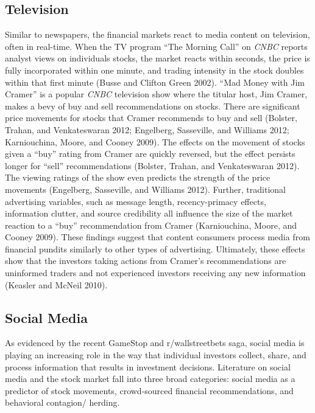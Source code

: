 \documentclass[12pt,]{article}
\begin{document}
\hypertarget{television}{%
\subsection{Television}\label{television}}

Similar to newspapers, the financial markets react to media content on
television, often in real-time. When the TV program ``The Morning Call''
on \emph{CNBC} reports analyst views on individuals stocks, the market
reacts within seconds, the price is fully incorporated within one
minute, and trading intensity in the stock doubles within that first
minute (Busse and Clifton Green 2002). ``Mad Money with Jim Cramer'' is
a popular \emph{CNBC} television show where the titular host, Jim
Cramer, makes a bevy of buy and sell recommendations on stocks. There
are significant price movements for stocks that Cramer recommends to buy
and sell (Bolster, Trahan, and Venkateswaran 2012; Engelberg,
Sasseville, and Williams 2012; Karniouchina, Moore, and Cooney 2009).
The effects on the movement of stocks given a ``buy'' rating from Cramer
are quickly reversed, but the effect persists longer for ``sell''
recommendations (Bolster, Trahan, and Venkateswaran 2012). The viewing
ratings of the show even predicts the strength of the price movements
(Engelberg, Sasseville, and Williams 2012). Further, traditional
advertising variables, such as message length, recency-primacy effects,
information clutter, and source credibility all influence the size of
the market reaction to a ``buy'' recommendation from Cramer
(Karniouchina, Moore, and Cooney 2009). These findings suggest that
content consumers process media from financial pundits similarly to
other types of advertising. Ultimately, these effects show that the
investors taking actions from Cramer's recommendations are uninformed
traders and not experienced investors receiving any new information
(Keasler and McNeil 2010).

\hypertarget{social-media}{%
\subsection{Social Media}\label{social-media}}

As evidenced by the recent GameStop and r/wallstreetbets saga, social
media is playing an increasing role in the way that individual investors
collect, share, and process information that results in investment
decisions. Literature on social media and the stock market fall into
three broad categories: social media as a predictor of stock movements,
crowd-sourced financial recommendations, and behavioral contagion/
herding.
\end{document}
